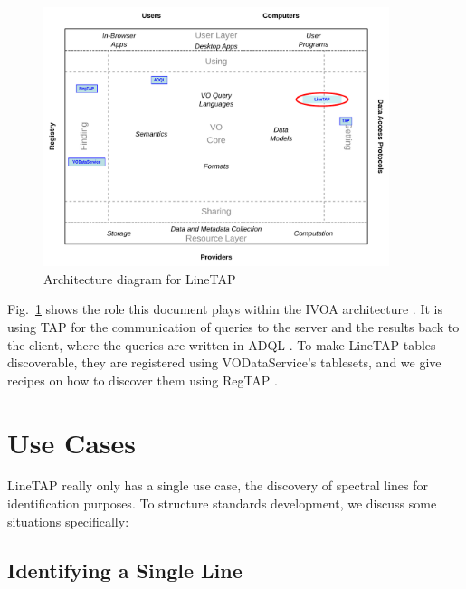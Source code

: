 \documentclass[11pt,a4paper]{ivoa}
\begin{document}
\begin{figure}
\centering


\includegraphics[width=0.9\textwidth]{role_diagram.pdf}
\caption{Architecture diagram for LineTAP}
\label{fig:archdiag}
\end{figure}

Fig.~\ref{fig:archdiag} shows the role this document plays within the
IVOA architecture \citep{2021ivoa.spec.1101D}.  It is using TAP
\citep{2019ivoa.spec.0927D} for the communication of queries to the
server and the results back to the client, where the queries are written
in ADQL \citep{2008ivoa.spec.1030O}.  To make LineTAP tables
discoverable, they are registered using VODataService's
\citep{2021ivoa.spec.1102D} tablesets, and we give recipes on how to
discover them using RegTAP \citep{2019ivoa.spec.1011D}.


\section{Use Cases}
\label{sect:use-cases}

LineTAP really only has a single use case, the discovery of spectral
lines for identification purposes.  To structure standards development,
we discuss some situations specifically:

\subsection{Identifying a Single Line}
\end{document}
